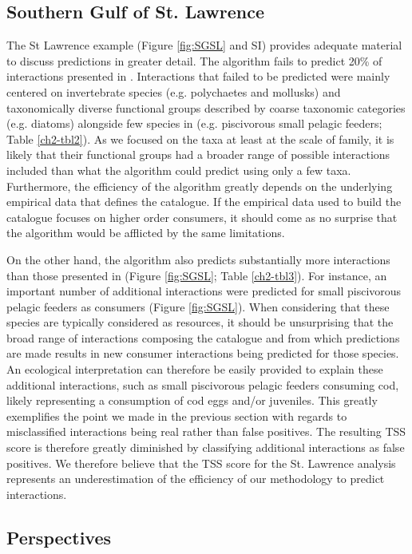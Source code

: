 \subsection{Southern Gulf of St. Lawrence}
The St Lawrence example (Figure \ref{fig:SGSL} and SI) provides adequate material to discuss predictions in greater detail. The algorithm fails to predict 20\% of interactions presented in \citet{savenkoff2004}. Interactions that failed to be predicted were mainly centered on invertebrate species (e.g. polychaetes and mollusks) and taxonomically diverse functional groups described by coarse taxonomic categories (e.g. diatoms) alongside few species in \citet{savenkoff2004} (e.g. piscivorous small pelagic feeders; Table \ref{ch2-tbl2}). As we focused on the taxa at least at the scale of family, it is likely that their functional groups had a broader range of possible interactions included than what the algorithm could predict using only a few taxa. Furthermore, the efficiency of the algorithm greatly depends on the underlying empirical data that defines the catalogue. If the empirical data used to build the catalogue focuses on higher order consumers, it should come as no surprise that the algorithm would be afflicted by the same limitations.

On the other hand, the algorithm also predicts substantially more interactions than those presented in \citet{savenkoff2004} (Figure \ref{fig:SGSL}; Table \ref{ch2-tbl3}).  For instance, an important number of additional interactions were predicted for small piscivorous pelagic feeders as consumers (Figure \ref{fig:SGSL}). When considering that these species are typically considered as resources, it should be unsurprising that the broad range of interactions composing the catalogue and from which predictions are made results in new consumer interactions being predicted for those species. An ecological interpretation can therefore be easily provided to explain these additional interactions, such as small piscivorous pelagic feeders consuming cod, likely representing a consumption of cod eggs and/or juveniles. This greatly exemplifies the point we made in the previous section with regards to misclassified interactions being real rather than false positives. The resulting TSS score is therefore greatly diminished by classifying additional interactions as false positives. We therefore believe that the TSS score for the St. Lawrence analysis represents an underestimation of the efficiency of our methodology to predict interactions.

\subsection{Perspectives}

